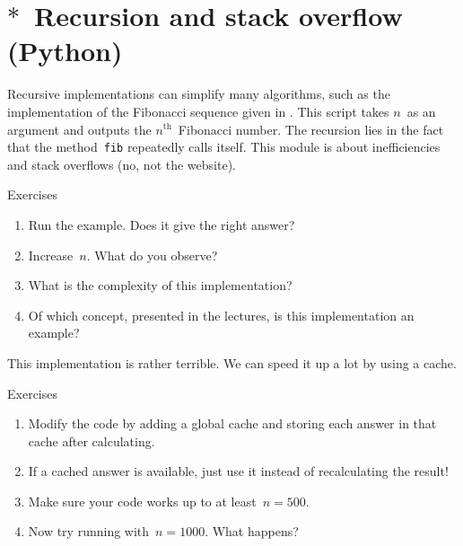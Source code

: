 \section{$\ast$~Recursion and stack overflow (Python)}

Recursive implementations can simplify many algorithms, such as the implementation of the Fibonacci sequence given in . This script takes $n$~as an argument and outputs the \ensuremath{n^{\text{th}}}~Fibonacci number. The recursion lies in the fact that the method~\texttt{fib} repeatedly calls itself. This module is about inefficiencies and stack overflows (no, not the website).
%
\begin{mybox}{Exercises}
    \begin{enumerate}
        \item Run the example. Does it give the right answer?
        \item Increase~$n$. What do you observe?
        \item What is the complexity of this implementation?
        \item Of which concept, presented in the lectures, is this implementation an example?
    \end{enumerate}
\end{mybox}

This implementation is rather terrible. We can speed it up a lot by using a cache.
%
\begin{mybox}{Exercises}
    \begin{enumerate}
        \item Modify the code by adding a global cache and storing each answer in that cache after calculating.
        \item If a cached answer is available, just use it instead of recalculating the result!
        \item Make sure your code works up to at least~$n = 500$.
        \item Now try running with~$n = 1000$. What happens?
    \end{enumerate}
\end{mybox}

